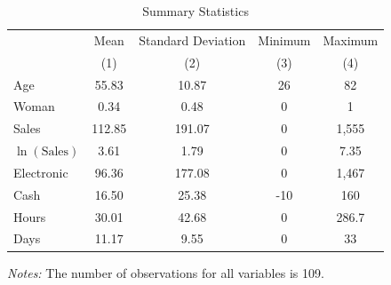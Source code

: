 \documentclass[12pt]{article}
\begin{document}
\begin{table}[H]
\centering
\begin{threeparttable}
\caption{\label{tab:summary}Summary Statistics}
\begin{tabular}{lcccc}
\toprule
 & Mean & Standard Deviation & Minimum & Maximum \\
 & (1) & (2) & (3) & (4) \\
\midrule
Age & 55.83 & 10.87 & 26 & 82 \\
Woman & 0.34 & 0.48 & 0 & 1 \\
Sales & 112.85 & 191.07 & 0 & 1,555 \\
$\ln(\text{Sales})$ & 3.61 & 1.79 & 0 & 7.35 \\
Electronic & 96.36 & 177.08 & 0 & 1,467 \\
Cash & 16.50 & 25.38 & -10 & 160 \\
Hours & 30.01 & 42.68 & 0 & 286.7 \\
Days & 11.17 & 9.55 & 0 & 33 \\
\bottomrule
\end{tabular}
\begin{tablenotes}[flushleft]   %
\small
\item \textit{Notes:} The number of observations for all variables is 109.
\end{tablenotes}
\end{threeparttable}
\end{table}
\clearpage
\end{document}
